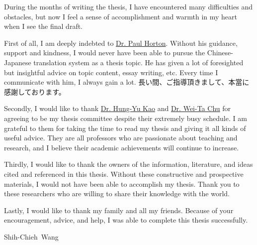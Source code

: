 \begin{CJK}{UTF8}{ipxm}
During the months of writing the thesis, I have encountered many difficulties and obstacles, but now I feel a sense of accomplishment and warmth in my heart when I see the final draft.

First of all, I am deeply indebted to \href{https://paulhorton.gitlab.io/}{Dr. Paul Horton}. Without his guidance, support and kindness, I would never have been able to pursue the Chinese-Japanese translation system as a thesis topic. He has given a lot of foresighted but insightful advice on topic content, essay writing, etc. Every time I communicate with him, I always gain a lot. 長い間、ご指導頂きまして、本當に感謝しております。

Secondly, I would like to thank \href{https://ikmlab.csie.ncku.edu.tw/advisor.html}{Dr. Hung-Yu Kao} and \href{http://mmcv.csie.ncku.edu.tw/~wtchu/}{Dr. Wei-Ta Chu} for agreeing to be my thesis committee despite their extremely busy schedule. I am grateful to them for taking the time to read my thesis and giving it all kinds of useful advice. They are all professors who are passionate about teaching and research, and I believe their academic achievements will continue to increase.

Thirdly, I would like to thank the owners of the information, literature, and ideas cited and referenced in this thesis. Without these constructive and prospective materials, I would not have been able to accomplish my thesis. Thank you to these researchers who are willing to share their knowledge with the world.

Lastly, I would like to thank my family and all my friends. Because of your encouragement, advice, and help, I was able to complete this thesis successfully. 

\end{CJK}

\begin{flushright}
\mbox{Shih-Chieh Wang}
\end{flushright}